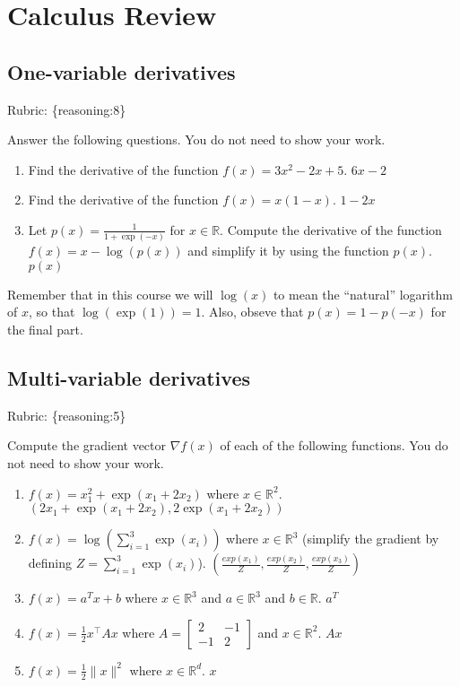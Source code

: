 \documentclass{article}
\def\rubric#1{\gre{Rubric: \{#1\}}}{}
\def\blu#1{{\color{blu}#1}}
\def\gre#1{{\color{gre}#1}}
\def\red#1{{\color{red}#1}}
\def\norm#1{\|#1\|}
\def\R{\mathbb{R}}
\def\half{\frac 1 2}
\begin{document}
\section{Calculus Review}



\subsection{One-variable derivatives}
\label{sub.one.var}
\rubric{reasoning:8}

\blu{Answer the following questions.} You do not need to show your work.

\begin{enumerate}
\item Find the derivative of the function $f(x) = 3x^2 -2x + 5$. \red{$6x-2$}
\item Find the derivative of the function $f(x) = x(1-x)$. \red{$1-2x$}
\item Let $p(x) = \frac{1}{1+\exp(-x)}$ for $x \in \R$. Compute the derivative of the function $f(x) = x-\log(p(x))$ and simplify it by using the function $p(x)$. \red{$p(x)$}
\end{enumerate}
Remember that in this course we will $\log(x)$ to mean the ``natural'' logarithm of $x$, so that $\log(\exp(1)) = 1$. Also, obseve that $p(x) = 1-p(-x)$ for the final part.

\subsection{Multi-variable derivatives}
\label{sub.multi.var}
\rubric{reasoning:5}

\blu{Compute the gradient vector $\nabla f(x)$ of each of the following functions.} You do not need to show your work.
\begin{enumerate}
\item $f(x) = x_1^2 + \exp(x_1 + 2x_2)$ where $x \in \R^2$. \red{$(2x_1 + \exp(x_1 + 2x_2), 2\exp(x_1 + 2x_2))$}
\item $f(x) = \log\left(\sum_{i=1}^3\exp(x_i)\right)$ where $x \in \R^3$ (simplify the gradient by defining $Z = \sum_{i=1}^3\exp(x_i)$). \red{$(\frac{exp(x_1)}{Z}, \frac{exp(x_2)}{Z}, \frac{exp(x_3)}{Z})$}
\item $f(x) = a^Tx + b$ where $x \in \R^3$ and $a \in \R^3$ and $b \in \R$. \red{$a^T$}
\item $f(x) = \half x^\top A x$ where $A=\left[ \begin{array}{cc}
2 & -1 \\
 -1 & 2 \end{array} \right]$ and $x \in \mathbb{R}^2$. \red{$Ax$}
 \item $f(x) = \frac{1}{2}\norm{x}^2$ where $x \in \R^d$. \red{$x$}
\end{enumerate}
\end{document}
